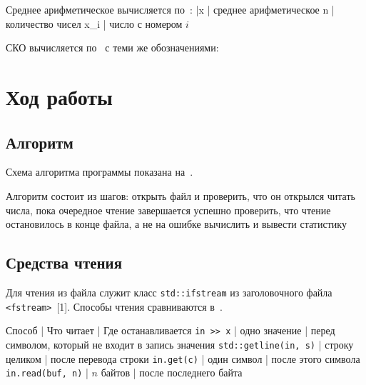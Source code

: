 \documentclass[a4paper,14pt]{extarticle}
\begin{document}
Среднее арифметическое вычисляется по~:
\bar{x} | среднее арифметическое
n | количество чисел
x_i | число с номером $i$

СКО вычисляется по~ с теми же обозначениями:

\section{Ход работы}

\subsection{Алгоритм}

Схема алгоритма программы показана на~.


Алгоритм состоит из шагов:
\suainum
открыть файл и проверить, что он открылся
читать числа, пока очередное чтение завершается успешно
проверить, что чтение остановилось в конце файла, а не на ошибке
вычислить и вывести статистику

\subsection{Средства чтения}

Для чтения из файла служит класс \texttt{std::ifstream} из заголовочного
файла \texttt{<fstream>}~[1]. Способы чтения сравниваются
в~.

Способ                       | Что читает     | Где останавливается
\texttt{in >> x}             | одно значение  | перед символом, который не входит в запись значения
\texttt{std::getline(in, s)} | строку целиком | после перевода строки
\texttt{in.get(c)}           | один символ    | после этого символа
\texttt{in.read(buf, n)}     | $n$ байтов     | после последнего байта
\end{document}

